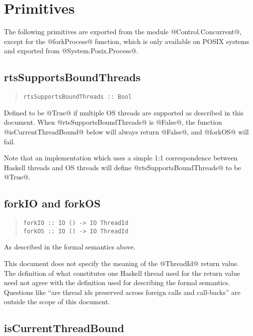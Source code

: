 \documentclass[a4paper,twoside]{article}
\begin{document}
\section{Primitives}

The following primitives are exported from the module @Control.Concurrent@,
except for the @forkProcess@ function, which is only available on POSIX systems
and exported from @System.Posix.Process@.

\subsection{rtsSupportsBoundThreads}

\begin{quote}
\begin{verbatim}
rtsSupportsBoundThreads :: Bool
\end{verbatim}
\end{quote}

Defined to be @True@ if multiple OS threads are supported as described in this
document. When @rtsSupportsBoundThreads@ is @False@, the function
@isCurrentThreadBound@ below will always return @False@, and @forkOS@ will fail.

Note that an implementation which uses a simple 1:1 correspondence between
Haskell threads and OS threads will define @rtsSupportsBoundThreads@ to be
@True@.

\subsection{forkIO and forkOS}

\begin{quote}
\begin{verbatim}
forkIO :: IO () -> IO ThreadId
forkOS :: IO () -> IO ThreadId
\end{verbatim}
\end{quote}

As described in the formal semantics above.

This document does not specify the meaning of the @ThreadId@ return value. The
definition of what constitutes one Haskell thread used for the return value
need not agree with the definition used for describing the formal semantics.
Questions like ``are thread ids preserved across foreign calls and call-backs''
are outside the scope of this document.

\subsection{isCurrentThreadBound}
\end{document}
